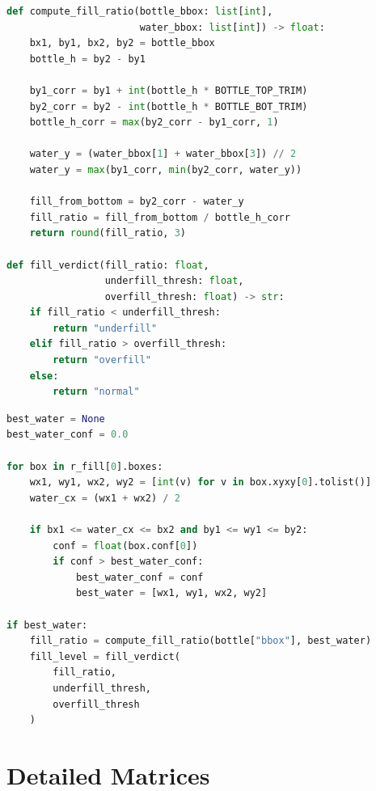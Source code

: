 \documentclass[12pt,a4paper]{report}
\begin{document}
\begin{lstlisting}[language=Python, caption={Mathematical fill-ratio computation and verdict}]
def compute_fill_ratio(bottle_bbox: list[int],
                       water_bbox: list[int]) -> float:
    bx1, by1, bx2, by2 = bottle_bbox
    bottle_h = by2 - by1

    by1_corr = by1 + int(bottle_h * BOTTLE_TOP_TRIM)
    by2_corr = by2 - int(bottle_h * BOTTLE_BOT_TRIM)
    bottle_h_corr = max(by2_corr - by1_corr, 1)

    water_y = (water_bbox[1] + water_bbox[3]) // 2
    water_y = max(by1_corr, min(by2_corr, water_y))

    fill_from_bottom = by2_corr - water_y
    fill_ratio = fill_from_bottom / bottle_h_corr
    return round(fill_ratio, 3)

def fill_verdict(fill_ratio: float,
                 underfill_thresh: float,
                 overfill_thresh: float) -> str:
    if fill_ratio < underfill_thresh:
        return "underfill"
    elif fill_ratio > overfill_thresh:
        return "overfill"
    else:
        return "normal"
\end{lstlisting}

\begin{lstlisting}[language=Python, caption={Selecting the water-surface box for the detected bottle}]
best_water = None
best_water_conf = 0.0

for box in r_fill[0].boxes:
    wx1, wy1, wx2, wy2 = [int(v) for v in box.xyxy[0].tolist()]
    water_cx = (wx1 + wx2) / 2

    if bx1 <= water_cx <= bx2 and by1 <= wy1 <= by2:
        conf = float(box.conf[0])
        if conf > best_water_conf:
            best_water_conf = conf
            best_water = [wx1, wy1, wx2, wy2]

if best_water:
    fill_ratio = compute_fill_ratio(bottle["bbox"], best_water)
    fill_level = fill_verdict(
        fill_ratio,
        underfill_thresh,
        overfill_thresh
    )
\end{lstlisting}

\section{Detailed Matrices}
\label{app:detailed-matrices}
\end{document}
